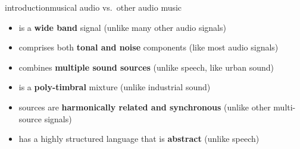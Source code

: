         \begin{frame}{introduction}{musical audio vs.\ other audio}
            music 
            \begin{itemize}
                \item   is a \textbf{wide band} signal (unlike many other audio signals)
                \item   comprises both \textbf{tonal and noise} components (like most audio signals)
                \item   combines \textbf{multiple sound sources} (unlike speech, like urban sound)
                \item   is a \textbf{poly-timbral} mixture (unlike industrial sound)
                \item   sources are \textbf{harmonically related and synchronous} (unlike other multi-source signals)
                \item   has a highly structured language that is \textbf{abstract} (unlike speech)
            \end{itemize}
        \end{frame}
        
